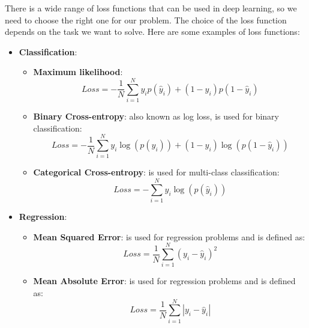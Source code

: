There is a wide range of loss functions that can be used in deep learning, so we
need to choose the right one for our problem. The choice of the loss function
depends on the task we want to solve. Here are some examples of loss functions:
\begin{itemize}
    \item \textbf{Classification}:
          \begin{itemize}
              \item \textbf{Maximum likelihood}:
                    \begin{equation}
                        Loss = - \frac{1}{N} \sum_{i=1}^N y_i p(\hat{y}_i) +
                        (1-y_i) p(1-\hat{y}_i)
                    \end{equation}
              \item \textbf{Binary Cross-entropy}: also known as log loss, is used
                    for binary classification:
                    \begin{equation}
                        Loss = - \frac{1}{N} \sum_{i=1}^N y_i \log(p(\hat{y}_i))
                        + (1-y_i) \log(p(1-\hat{y}_i))
                    \end{equation}
              \item \textbf{Categorical Cross-entropy}: is used for multi-class
                    classification:
                    \begin{equation}
                        Loss = - \sum_{i=1}^N y_i \log(p(\hat{y}_{i}))
                    \end{equation}
          \end{itemize}
    \item \textbf{Regression}:
          \begin{itemize}
              \item \textbf{Mean Squared Error}: is used for regression problems
                    and is defined as:
                    \begin{equation}
                        Loss = \frac{1}{N} \sum_{i=1}^N (y_i - \hat{y}_i)^2
                    \end{equation}
              \item \textbf{Mean Absolute Error}: is used for regression problems
                    and is defined as:
                    \begin{equation}
                        Loss = \frac{1}{N} \sum_{i=1}^N |y_i - \hat{y}_i|
                    \end{equation}

\end{itemize}
\end{itemize}
